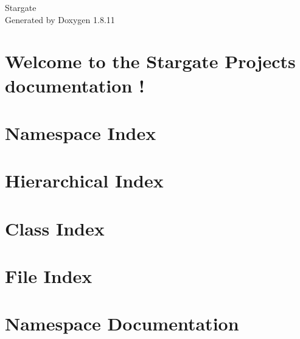 \documentclass[twoside]{book}
\newcommand{\+}{\discretionary{\mbox{\scriptsize$\hookleftarrow$}}{}{}}
\newcommand{\clearemptydoublepage}{%
  \newpage{\pagestyle{empty}\cleardoublepage}%
}
\begin{document}
\hypersetup{pageanchor=false,
             bookmarksnumbered=true,
             pdfencoding=unicode
            }
\begin{titlepage}
\vspace*{7cm}
\begin{center}%
{\Large Stargate }\\
\vspace*{1cm}
{\large Generated by Doxygen 1.8.11}\\
\end{center}
\end{titlepage}
\clearemptydoublepage
\tableofcontents
\clearemptydoublepage
{}
\hypersetup{pageanchor=true}

\chapter{Welcome to the Stargate Project\textquotesingle{}s documentation !}
\label{index}\hypertarget{index}{}
\chapter{Namespace Index}

\chapter{Hierarchical Index}

\chapter{Class Index}

\chapter{File Index}

\chapter{Namespace Documentation}











\end{document}
